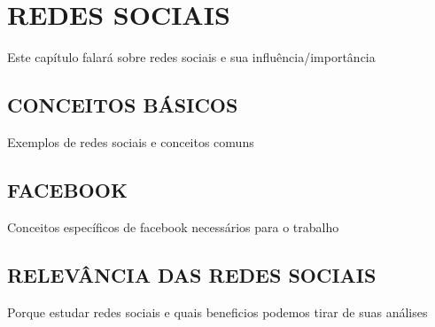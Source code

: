 
\chapter{REDES SOCIAIS}
\label{chap:redessociais}
Este capítulo falará sobre redes sociais e sua influência/importância

\section{CONCEITOS BÁSICOS}
\label{sec:conceitosredessociais}
Exemplos de redes sociais e conceitos comuns

\section{FACEBOOK}
\label{sec:facebook}
Conceitos específicos de facebook necessários para o trabalho

\section{RELEVÂNCIA DAS REDES SOCIAIS}
\label{sec:relevanciaredessociais}
Porque estudar redes sociais e quais beneficios podemos tirar de suas análises